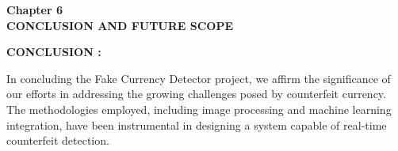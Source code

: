\documentclass[12pt]{article}
\begin{document}

 
 
% 


\begin{center}
 \LARGE \textbf {Chapter 6 }\\[10mm]
 \Large \textbf{CONCLUSION AND FUTURE SCOPE }\\[10mm]
 \end{center}
 \large \textbf{CONCLUSION :}\\[3mm]\par

In concluding the Fake Currency Detector project, we affirm the significance of our efforts in addressing the growing challenges posed by counterfeit currency. The methodologies employed, including image processing and machine learning integration, have been instrumental in designing a system capable of real-time counterfeit detection.\\[2mm]
\end{document}
